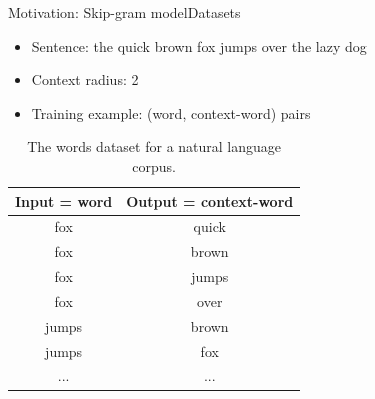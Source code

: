 \documentclass{beamer}
\begin{document}
\begin{frame}{Motivation: Skip-gram model}{Datasets}
	\begin{itemize}
		\item Sentence: the quick brown fox jumps over the lazy dog
		\item Context radius: 2
		\item Training example: (word, context-word) pairs
	\end{itemize}
	\begin{table}[H]\centering
		\caption{The words dataset for a natural language corpus.}
		\begin{tabular}{|c|c|}  \hline
			\textbf{Input = word} & \textbf{Output = context-word} \\ \hline
			fox & quick \\ \hline
			fox & brown \\ \hline
			fox & jumps \\ \hline
			fox & over \\ \hline
			jumps & brown \\ \hline
			jumps & fox \\ \hline
			... & ...       \\ \hline
		\end{tabular}
		\label{tab:words}
	\end{table}
\end{frame}
\end{document}
